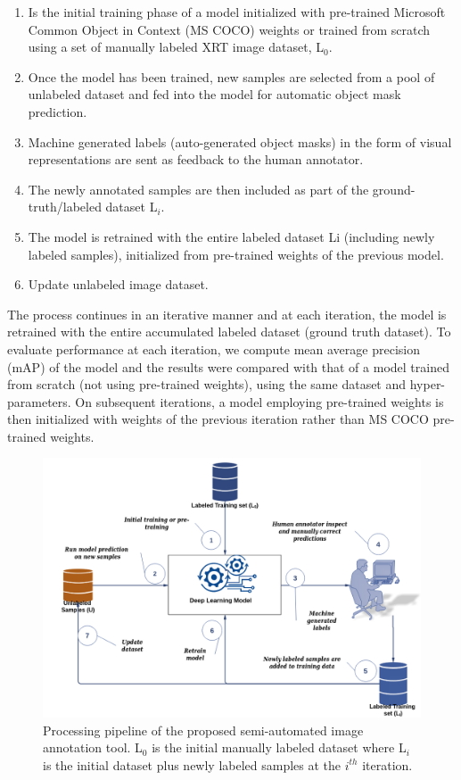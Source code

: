 \documentclass[conference]{IEEEtran}
\begin{document}
		\begin{enumerate}
			\item Is the initial training phase of a model initialized with pre-trained Microsoft Common Object in Context (MS COCO) weights or trained from scratch using a set of manually labeled XRT image dataset, L$ _{0} $.
			\item Once the model has been trained, new samples are selected from a pool of unlabeled dataset and fed into the model for automatic object mask prediction.
			\item Machine generated labels (auto-generated object masks) in the form of visual representations are sent as feedback to the human annotator.
			\item The newly annotated samples are then included as part of the ground-truth/labeled dataset L$ _{i} $.
			\item The model is retrained with the entire labeled dataset Li (including newly labeled samples), initialized from pre-trained weights of the previous model.
			\item Update unlabeled image dataset.\\
		\end{enumerate}
	
	  The process continues in an iterative manner and at each iteration,
the model is retrained with the entire accumulated labeled dataset (ground truth dataset).
To evaluate performance at each iteration, we compute mean average precision (mAP) of
the model and the results were compared with that of a model trained from scratch (not
using pre-trained weights), using the same dataset and hyper-parameters. On subsequent
iterations, a model employing pre-trained weights is then initialized with weights of the
previous iteration rather than MS COCO pre-trained weights.
		
		\begin{figure}[htbp]
			\centerline{\includegraphics[width=1\linewidth]{Semi-automated IA pipeline2.png}}
			\caption{Processing pipeline of the proposed semi-automated image annotation tool. L$ _{0} $
 is the initial manually labeled dataset where L$ _{i} $
is the initial dataset plus newly labeled
samples at the $ i^{th} $ iteration.}
			\label{fig1}
		\end{figure}		
		
\end{document}
